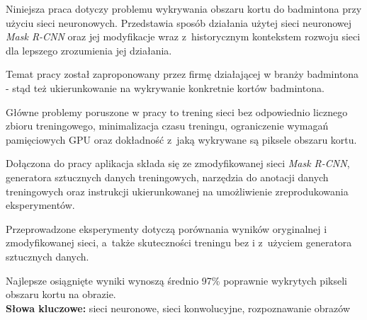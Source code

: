Niniejsza praca dotyczy problemu wykrywania obszaru kortu do badmintona przy użyciu sieci neuronowych.
Przedstawia sposób działania użytej sieci neuronowej \textit{Mask R-CNN} \cite{general-mask-rcnn} oraz jej modyfikacje wraz z~historycznym kontekstem rozwoju sieci dla lepszego zrozumienia jej działania.

Temat pracy został zaproponowany przez firmę \blue{} działającej w branży badmintona - stąd też ukierunkowanie na wykrywanie konkretnie kortów badmintona.

Główne problemy poruszone w pracy to trening sieci bez odpowiednio licznego zbioru treningowego, minimalizacja czasu treningu, ograniczenie wymagań pamięciowych GPU oraz dokładność z~jaką wykrywane są piksele obszaru kortu.

Dołączona do pracy aplikacja składa się ze zmodyfikowanej sieci \textit{Mask R-CNN}, generatora sztucznych danych treningowych, narzędzia do anotacji danych treningowych oraz instrukcji ukierunkowanej na umożliwienie zreprodukowania eksperymentów.

Przeprowadzone eksperymenty dotyczą porównania wyników oryginalnej i zmodyfikowanej sieci, a~także skuteczności treningu bez i z~użyciem generatora sztucznych danych.

Najlepsze osiągnięte wyniki wynoszą średnio 97\% poprawnie wykrytych pikseli obszaru kortu na obrazie.
\\

\noindent \textbf{Słowa kluczowe:} sieci neuronowe, sieci konwolucyjne, rozpoznawanie obrazów
